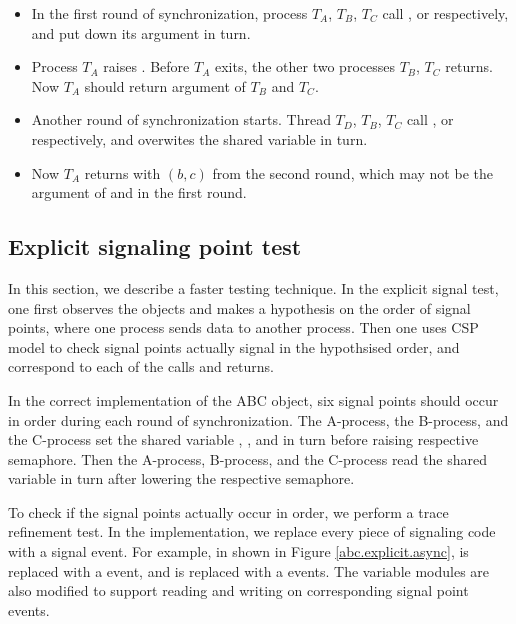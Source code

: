 \documentclass[a4paper, 12pt]{article}
\begin{document}

\begin{itemize}
  \item In the first round of synchronization, process $T_A$, $T_B$, $T_C$ call ,  or  respectively, and put down its argument in turn.
  \item Process $T_A$ raises . Before $T_A$ exits, the other two processes $T_B$, $T_C$ returns. Now $T_A$ should return argument of $T_B$ and $T_C$.
  \item Another round of synchronization starts. Thread $T_D$, $T_B$, $T_C$ call ,  or  respectively, and overwites the shared variable  in turn.
  \item Now $T_A$ returns with $(b,c)$ from the second round, which may not be the argument of  and  in the first round.
\end{itemize}

\subsection{Explicit signaling point test}
In this section, we describe a faster testing technique. In the explicit signal test, one first observes the objects and makes a hypothesis on the order of signal points, where one process sends data to another process. Then one uses CSP model to check signal points actually signal in the hypothsised order, and correspond to each of the calls and returns.  

In the correct implementation of the ABC object, six signal points should occur in order during each round of synchronization. The A-process, the B-process, and the C-process set the shared variable , , and  in turn before raising respective semaphore. Then the A-process, B-process, and the C-process read the shared variable in turn after lowering the respective semaphore. 

To check if the signal points actually occur in order, we perform a trace refinement test. In the implementation, we replace every piece of signaling code with a signal event. For example, in  shown in Figure \ref{abc.explicit.async},  is replaced with a  event, and  is replaced with a  events. The variable modules are also modified to support reading and writing on corresponding signal point events.
\end{document}
